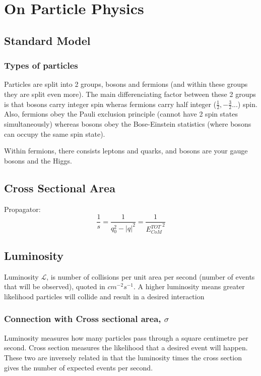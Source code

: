 \documentclass[11pt,a4paper]{article}
\begin{document}

\section{On Particle Physics}
\subsection{Standard Model}
\subsubsection{Types of particles}
Particles are split into 2 groups, bosons and fermions (and within these groups they are split even more). The main differenciating factor between these 2 groups is that bosons carry integer spin wheras fermions carry half integer ($\frac{1}{2}, -\frac{3}{2}...$) spin. Also, fermions obey the Pauli exclusion principle (cannot have 2 spin states simultaneously) whereas bosons obey the Bose-Einstein statistics (where bosons can occupy the same spin state).

Within fermions, there consists leptons and quarks, and bosons are your gauge bosons and the Higgs.


\subsection{Cross Sectional Area}
Propagator:
\begin{equation}
    \frac{1}{s} = \frac{1}{q_0^2 - |q|^2} = \frac{1}{{E^{TOT}_{CoM}}^2}
\end{equation}

\subsection{Luminosity}
Luminosity $\mathscr{L}$, is number of collisions per unit area per second (number of events that will be observed), quoted in $cm^{-2}s^{-1}$. A higher luminosity means greater likelihood particles will collide and result in a desired interaction

\subsubsection{Connection with Cross sectional area, $\sigma$}
Luminosity measures how many particles pass through a square centimetre per second. Cross section measures
the likelihood that a desired event will happen. These two are inversely related in that the luminosity times the
cross section gives the number of expected events per second.
\end{document}
